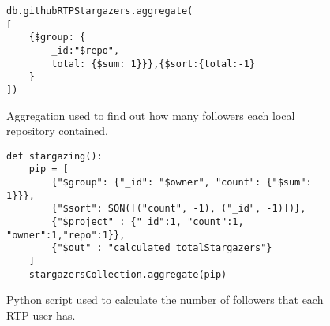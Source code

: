 \begin{figure}
\begin{lstlisting}
db.githubRTPStargazers.aggregate(
[
	{$group: {
    	_id:"$repo", 
        total: {$sum: 1}}},{$sort:{total:-1}
   	}
])
\end{lstlisting}
\caption{Aggregation used to find out how many followers each local repository contained.}
\label{fig:stargazers-count}
\end{figure}

\begin{figure}
\begin{lstlisting}
def stargazing():
    pip = [
        {"$group": {"_id": "$owner", "count": {"$sum": 1}}},
        {"$sort": SON([("count", -1), ("_id", -1)])},
        {"$project" : {"_id":1, "count":1, "owner":1,"repo":1}},
        {"$out" : "calculated_totalStargazers"}
    ]
    stargazersCollection.aggregate(pip)
\end{lstlisting}
\caption{Python script used to calculate the number of followers that each RTP user has.}
\label{fig:stargazing-aggregation}
\end{figure}

